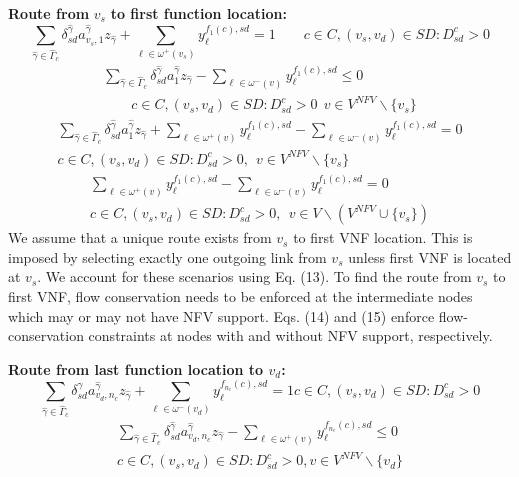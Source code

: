 \documentclass[12pt]{article}
\begin{document}
\textbf{Route from} \textbf{$v_s$} \textbf{to first function location:}
\begin{equation}
\sum_{\hat{\gamma}\in \hat{\Gamma}_c}\delta_{sd}^{\hat{\gamma}}a_{v_s ,1}^{\hat{\gamma}}z_{\hat{\gamma}}+\sum_{\ell \in \omega^{+} (v_s)}y_{\ell}^{f_1 (c),sd}=1 \quad \quad c \in C, (v_s, v_d) \in SD: D_{sd}^{c}>0
\end{equation}
\begin{equation}
\begin{split}
\sum_{\hat{\gamma}\in \hat{\Gamma}_c}\delta_{sd}^{\hat{\gamma}}a_{1}^{\hat{\gamma}}z_{\hat{\gamma}}-\sum_{\ell \in \omega^{-} (v)}y_{\ell}^{f_1 (c),sd} \leq 0 \\
 \quad \quad c \in C, (v_s, v_d) \in SD: D_{sd}^{c}>0 \ \ v\in V^{NFV} \backslash  \{v_s\}
\end{split}
\end{equation}
\begin{equation}
\begin{split}
\sum_{\hat{\gamma}\in \hat{\Gamma}_c}\delta_{sd}^{\hat{\gamma}}a_{1}^{\hat{\gamma}}z_{\hat{\gamma}}+\sum_{\ell \in \omega^{+} (v)}y_{\ell}^{f_1 (c),sd}-\sum_{\ell \in \omega^{-} (v)}y_{\ell}^{f_1 (c),sd}=0 \\
  c \in C, (v_s, v_d) \in SD: D_{sd}^{c}>0, \ \ v\in V^{NFV} \backslash  \{v_s\}
\end{split}
\end{equation}
\begin{equation}
\begin{split}
\sum_{\ell \in \omega^{+} (v)}y_{\ell}^{f_1 (c),sd}-\sum_{\ell \in \omega^{-} (v)}y_{\ell}^{f_1 (c),sd}=0 \\
  c \in C, (v_s, v_d) \in SD: D_{sd}^{c}>0, \ \ v\in V \backslash (V^{NFV} \cup   \{v_s\})
\end{split}
\end{equation}
We assume that a unique route exists from $v_s$ to first VNF location. This is imposed by selecting exactly one outgoing link from $v_s$ unless first VNF is located at $v_s$. We account for these scenarios using Eq. (13). To find the route from $v_s$ to first VNF, flow conservation needs to be enforced at the intermediate nodes which may or may not have NFV support. Eqs. (14) and (15) enforce flow-conservation constraints at nodes with and without NFV support, respectively.

\textbf{Route from last function location to $v_d$:}
\begin{equation}
\sum_{\hat{\gamma}\in \hat{\Gamma}_c}\delta_{sd}^{\hat{\gamma}}a_{v_d , n_c}^{\hat{\gamma}}z_{\hat{\gamma}}+\sum_{\ell \in \omega^{-} (v_d)}y_{\ell}^{f_{n_c} (c),sd}=1 c \in C, (v_s, v_d) \in SD: D_{sd}^{c}>0
\end{equation}
\begin{equation}
\begin{split}
\sum_{\hat{\gamma}\in \hat{\Gamma}_c}\delta_{sd}^{\hat{\gamma}}a_{v_d , n_c}^{\hat{\gamma}}z_{\hat{\gamma}}-\sum_{\ell \in \omega^{+} (v)}y_{\ell}^{f_{n_c} (c),sd}\leq 0 \\
 c \in C, (v_s, v_d) \in SD: D_{sd}^{c}>0, v \in V^{NFV} \backslash \{v_d\}
\end{split}
\end{equation}
\end{document}
